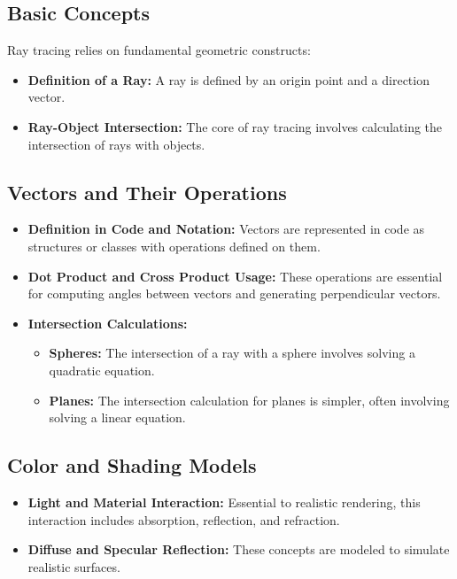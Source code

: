 \documentclass[12pt]{article}
\begin{document}
\subsection{Basic Concepts}
Ray tracing relies on fundamental geometric constructs:
\begin{itemize}
    \item \textbf{Definition of a Ray:} A ray is defined by an origin point and a direction vector.
    \item \textbf{Ray-Object Intersection:} The core of ray tracing involves calculating the intersection of rays with objects.
\end{itemize}
\subsection{Vectors and Their Operations}
\begin{itemize}
    \item \textbf{Definition in Code and Notation:} Vectors are represented in code as structures or classes with operations defined on them.
    \item \textbf{Dot Product and Cross Product Usage:} These operations are essential for computing angles between vectors and generating perpendicular vectors.
    \item \textbf{Intersection Calculations:}
          \begin{itemize}
              \item \textbf{Spheres:} The intersection of a ray with a sphere involves solving a quadratic equation.
              \item \textbf{Planes:} The intersection calculation for planes is simpler, often involving solving a linear equation.
          \end{itemize}
\end{itemize}
\subsection{Color and Shading Models}
\begin{itemize}
    \item \textbf{Light and Material Interaction:} Essential to realistic rendering, this interaction includes absorption, reflection, and refraction.
    \item \textbf{Diffuse and Specular Reflection:} These concepts are modeled to simulate realistic surfaces.
\end{itemize}
\end{document}
